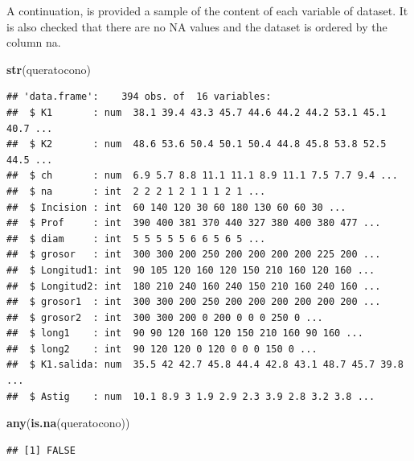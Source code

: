 \documentclass[
]{article}
\newenvironment{Shaded}{\begin{snugshade}}{\end{snugshade}}
\newcommand{\KeywordTok}[1]{\textcolor[rgb]{0.13,0.29,0.53}{\textbf{#1}}}
\newcommand{\NormalTok}[1]{#1}
\newcommand{\OperatorTok}[1]{\textcolor[rgb]{0.81,0.36,0.00}{\textbf{#1}}}
\newcommand{\StringTok}[1]{\textcolor[rgb]{0.31,0.60,0.02}{#1}}
\begin{document}
A continuation, is provided a sample of the content of each variable of
dataset. It is also checked that there are no NA values and the dataset
is ordered by the column na.

\begin{Shaded}
\begin{Highlighting}[]
\KeywordTok{str}\NormalTok{(queratocono)}
\end{Highlighting}
\end{Shaded}

\begin{verbatim}
## 'data.frame':    394 obs. of  16 variables:
##  $ K1       : num  38.1 39.4 43.3 45.7 44.6 44.2 44.2 53.1 45.1 40.7 ...
##  $ K2       : num  48.6 53.6 50.4 50.1 50.4 44.8 45.8 53.8 52.5 44.5 ...
##  $ ch       : num  6.9 5.7 8.8 11.1 11.1 8.9 11.1 7.5 7.7 9.4 ...
##  $ na       : int  2 2 2 1 2 1 1 1 2 1 ...
##  $ Incision : int  60 140 120 30 60 180 130 60 60 30 ...
##  $ Prof     : int  390 400 381 370 440 327 380 400 380 477 ...
##  $ diam     : int  5 5 5 5 5 6 6 5 6 5 ...
##  $ grosor   : int  300 300 200 250 200 200 200 200 225 200 ...
##  $ Longitud1: int  90 105 120 160 120 150 210 160 120 160 ...
##  $ Longitud2: int  180 210 240 160 240 150 210 160 240 160 ...
##  $ grosor1  : int  300 300 200 250 200 200 200 200 200 200 ...
##  $ grosor2  : int  300 300 200 0 200 0 0 0 250 0 ...
##  $ long1    : int  90 90 120 160 120 150 210 160 90 160 ...
##  $ long2    : int  90 120 120 0 120 0 0 0 150 0 ...
##  $ K1.salida: num  35.5 42 42.7 45.8 44.4 42.8 43.1 48.7 45.7 39.8 ...
##  $ Astig    : num  10.1 8.9 3 1.9 2.9 2.3 3.9 2.8 3.2 3.8 ...
\end{verbatim}

\begin{Shaded}
\begin{Highlighting}[]
\KeywordTok{any}\NormalTok{(}\KeywordTok{is.na}\NormalTok{(queratocono))}
\end{Highlighting}
\end{Shaded}

\begin{verbatim}
## [1] FALSE
\end{verbatim}

\begin{Shaded}
\end{Shaded}
\end{document}
